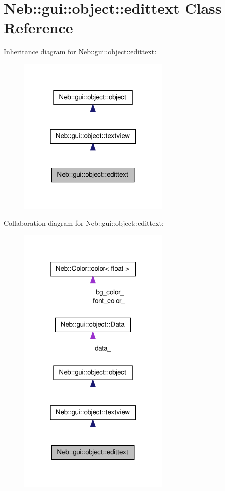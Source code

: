 \hypertarget{classNeb_1_1gui_1_1object_1_1edittext}{\section{\-Neb\-:\-:gui\-:\-:object\-:\-:edittext \-Class \-Reference}
\label{classNeb_1_1gui_1_1object_1_1edittext}
}


\-Inheritance diagram for \-Neb\-:\-:gui\-:\-:object\-:\-:edittext\-:
\nopagebreak
\begin{figure}[H]
\begin{center}
\leavevmode
\includegraphics[width=208pt]{classNeb_1_1gui_1_1object_1_1edittext__inherit__graph}
\end{center}
\end{figure}


\-Collaboration diagram for \-Neb\-:\-:gui\-:\-:object\-:\-:edittext\-:
\nopagebreak
\begin{figure}[H]
\begin{center}
\leavevmode
\includegraphics[width=208pt]{classNeb_1_1gui_1_1object_1_1edittext__coll__graph}
\end{center}
\end{figure}
